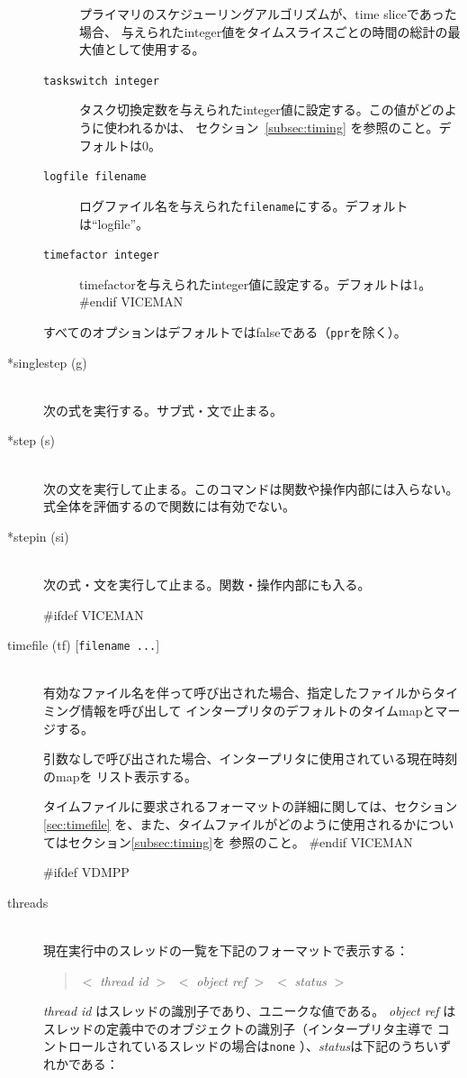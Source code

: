 \documentclass[\pformat,12pt]{article}
\begin{document}
\begin{description}
\begin{description}
    プライマリのスケジューリングアルゴリズムが、time sliceであった場合、
    与えられたinteger値をタイムスライスごとの時間の総計の最大値として使用する。
  \item[{\tt taskswitch integer}]
    タスク切換定数を与えられたinteger値に設定する。この値がどのように使われるかは、
    セクション~\ref{subsec:timing} を参照のこと。デフォルトは0。
  \item[{\tt logfile filename}]
    ログファイル名を与えられた{\tt filename}にする。デフォルトは``logfile''。
  \item[{\tt timefactor integer}]
    timefactorを与えられたinteger値に設定する。デフォルトは1。
#endif VICEMAN
  \end{description}
  
  すべてのオプションはデフォルトではfalseである（{\tt ppr}を除く）。
 
\item[*singlestep (g)] \mbox{}\\
  次の式を実行する。サブ式・文で止まる。

\item[*step (s)] \mbox{}\\
  次の文を実行して止まる。このコマンドは関数や操作内部には入らない。
  式全体を評価するので関数には有効でない。

\item[*stepin (si)] \mbox{}\\
  次の式・文を実行して止まる。関数・操作内部にも入る。

#ifdef VICEMAN
\item[timefile (tf) \mbox{[{\tt filename ...}]}] \mbox{}\\
  有効なファイル名を伴って呼び出された場合、指定したファイルからタイミング情報を呼び出して
  インタープリタのデフォルトのタイムmapとマージする。

  引数なしで呼び出された場合、インタープリタに使用されている現在時刻のmapを
  リスト表示する。

  タイムファイルに要求されるフォーマットの詳細に関しては、セクション\ref{sec:timefile}
  を、また、タイムファイルがどのように使用されるかについてはセクション\ref{subsec:timing}を
  参照のこと。
#endif VICEMAN

#ifdef VDMPP
\item[threads]\mbox{}\\
現在実行中のスレッドの一覧を下記のフォーマットで表示する：
\begin{quote}
  $<$ \textit{thread id} $>$\ $<$ \textit{object ref} $>$\ $<$
\textit{status} $>$
\end{quote}
\textit{thread id} はスレッドの識別子であり、ユニークな値である。
\textit{object ref} はスレッドの定義中でのオブジェクトの識別子（インタープリタ主導で
コントロールされているスレッドの場合は\texttt{none} ）、\textit{status}は下記のうちいずれかである：


\end{description}
\end{document}
